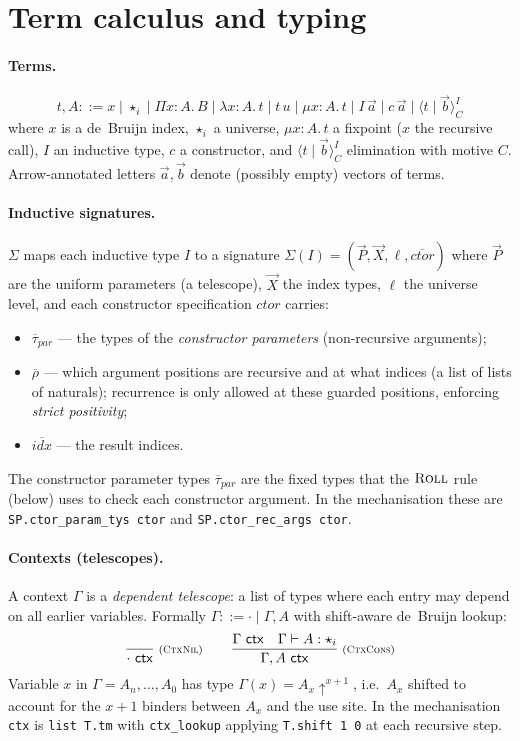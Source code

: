 \documentclass[runningheads]{llncs}
\begin{document}
\section{Term calculus and typing}
\label{sec:terms}

\paragraph{Terms.}
\[
t,A ::= x \mid \star_i \mid \Pi x{:}A.\,B \mid \lambda x{:}A.\,t
        \mid t\,u \mid \mu x{:}A.\,t \mid I\,\vec{a} \mid c\,\vec{a}
        \mid \langle t \mid \vec{b} \rangle^I_C
\]
where $x$ is a de~Bruijn index, $\star_i$ a universe, $\mu x{:}A.\,t$ a
fixpoint ($x$ the recursive call), $I$ an inductive type, $c$ a
constructor, and $\langle t \mid \vec{b} \rangle^I_C$ elimination with motive $C$.
Arrow-annotated letters $\vec{a},\vec{b}$ denote (possibly empty) vectors of terms.

\paragraph{Inductive signatures.}
$\Sigma$ maps each inductive type $I$ to a signature $\Sigma(I)
= (\vec{P}, \vec{X}, \ell, \overline{\textit{ctor}})$ where $\vec{P}$
are the uniform parameters (a telescope), $\vec{X}$ the index types,
$\ell$ the universe level, and each constructor specification
$\textit{ctor}$ carries:
\begin{itemize}
\item $\overline{\tau}_{\!\textit{par}}$ — the types of the
  \emph{constructor parameters} (non-recursive arguments);
\item $\overline{\rho}$ — which argument positions are recursive and
  at what indices (a list of lists of naturals); recurrence
  is only allowed at these guarded positions, enforcing
  \emph{strict positivity};
\item $\overline{\textit{idx}}$ — the result indices.
\end{itemize}
The constructor parameter types $\overline{\tau}_{\!\textit{par}}$
are the fixed types that the $\textsc{Roll}$ rule (below) uses to check
each constructor argument.  In the mechanisation these are
\texttt{SP.ctor\_param\_tys ctor} and \texttt{SP.ctor\_rec\_args ctor}.

\paragraph{Contexts (telescopes).}
A context $\Gamma$ is a \emph{dependent telescope}: a list of types
where each entry may depend on all earlier variables.
Formally $\Gamma ::= \cdot \mid \Gamma, A$
with shift-aware de~Bruijn lookup:
\[
\dfrac{}{\cdot\ \mathsf{ctx}}\;{\scriptstyle(\textsc{CtxNil})}
\qquad
\dfrac{\Gamma\ \mathsf{ctx}\quad \Gamma\vdash A:\star_i}{\Gamma,A\ \mathsf{ctx}}\;{\scriptstyle(\textsc{CtxCons})}
\]
Variable $x$ in $\Gamma = A_n,\dots,A_0$ has type
$\Gamma(x) = A_x\uparrow^{x+1}$, i.e.\ $A_x$ shifted to account for the
$x{+}1$ binders between $A_x$ and the use site.
In the mechanisation \texttt{ctx} is \texttt{list T.tm} with
\texttt{ctx\_lookup} applying \texttt{T.shift~1~0} at each recursive step.
\end{document}
